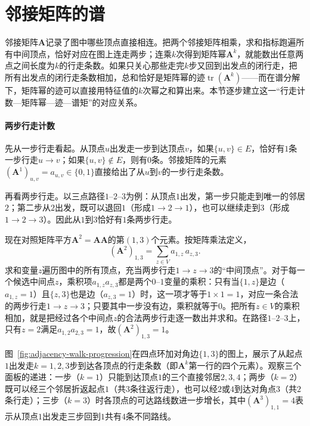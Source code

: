 \section{邻接矩阵的谱}
\label{sec:adjacency-walk-counts}

邻接矩阵$\bm A$记录了图中哪些顶点直接相连。把两个邻接矩阵相乘，求和指标跑遍所有中间顶点，恰好对应在图上连走两步；连乘$k$次得到矩阵幂$\bm A^k$，就能数出任意两点之间长度为$k$的行走条数。如果只关心那些走完$k$步又回到出发点的闭行走，把所有出发点的闭行走条数相加，总和恰好是矩阵幂的迹$\operatorname{tr}(\bm A^k)$——而在谱分解下，矩阵幂的迹可以直接用特征值的$k$次幂之和算出来。本节逐步建立这一“行走计数—矩阵幂—迹—谱矩”的对应关系。

\paragraph{两步行走计数}

先从一步行走看起。从顶点$u$出发走一步到达顶点$v$，如果$\{u,v\}\in E$，恰好有$1$条一步行走$u\to v$；如果$\{u,v\}\notin E$，则有$0$条。邻接矩阵的元素$(\bm A^1)_{u,v}=a_{u,v}\in\{0,1\}$直接给出了从$u$到$v$的一步行走条数。

再看两步行走。以三点路径$1\text{--}2\text{--}3$为例：从顶点$1$出发，第一步只能走到唯一的邻居$2$；第二步从$2$出发，既可以退回$1$（形成$1\to2\to1$），也可以继续走到$3$（形成$1\to2\to3$）。因此从$1$到$3$恰好有$1$条两步行走。

现在对照矩阵平方$\bm A^2=\bm A\bm A$的第$(1,3)$个元素。按矩阵乘法定义，
\[
(\bm A^2)_{1,3}=\sum_{z\in V}a_{1,z}\,a_{z,3}.
\]
求和变量$z$遍历图中的所有顶点，充当两步行走$1\to z\to 3$的“中间顶点”。对于每一个候选中间点$z$，乘积项$a_{1,z}a_{z,3}$都是两个$0$--$1$变量的乘积：只有当$\{1,z\}$是边（$a_{1,z}=1$）且$\{z,3\}$也是边（$a_{z,3}=1$）时，这一项才等于$1\times 1=1$，对应一条合法的两步行走$1\to z\to 3$；只要其中一步没有边，乘积就等于$0$。把所有$z\in V$的乘积相加，就是把经过各个中间点$z$的合法两步行走逐一数出并求和。在路径$1\text{--}2\text{--}3$上，只有$z=2$满足$a_{1,2}a_{2,3}=1$，故$(\bm A^2)_{1,3}=1$。

图~\ref{fig:adjacency-walk-progression}在四点环加对角边$\{1,3\}$的图上，展示了从起点$1$出发走$k=1,2,3$步到达各顶点的行走条数（即$\bm A^k$第一行的四个元素）。观察三个面板的递进：一步（$k=1$）只能到达顶点$1$的三个直接邻居$2,3,4$；两步（$k=2$）既可以经三个邻居折返起点$1$（共$3$条往返行走），也可以经$2$或$4$到达对角点$3$（共$2$条行走）；三步（$k=3$）时各顶点的可达路线数进一步增长，其中$(\bm A^3)_{1,1}=4$表示从顶点$1$出发走三步回到$1$共有$4$条不同路线。

